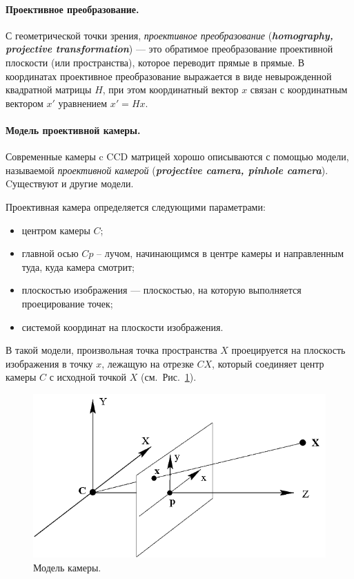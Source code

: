 \documentclass[oneside,final,12pt]{scrartcl}
\begin{document}
			\paragraph{Проективное преобразование.} С геометрической точки зрения, \textit{проективное преобразование} (\textit{\textbf{homography, projective transformation}}) — это обратимое преобразование проективной плоскости (или пространства), которое переводит прямые в прямые. В координатах проективное преобразование выражается в виде невырожденной квадратной матрицы \(H\), при этом координатный вектор \(x\) связан с координатным вектором \(x'\) уравнением \(x' = H x\).

			\paragraph{Модель проективной камеры.} Современные камеры c CCD матрицей хорошо описываются с помощью модели, называемой \textit{проективной камерой} (\textit{\textbf{projective camera, pinhole camera}}). Cуществуют и другие модели.

			Проективная камера определяется следующими параметрами:
			\begin{itemize}
				\item центром камеры \(C\);
				\item главной осью \(Cp\) -- лучом, начинающимся в центре камеры и направленным туда, куда камера смотрит;
				\item плоскостью изображения — плоскостью, на которую выполняется проецирование точек;
				\item системой координат на плоскости изображения.
			\end{itemize}
			В такой модели, произвольная точка пространства \(X\) проецируется на плоскость изображения в точку \(x\), лежащую на отрезке \(CX\), который соединяет центр камеры \(C\) с исходной точкой \(X\) (см.~Рис.~\ref{fig:cameramodel}).
			\begin{figure}[h]
				\centering
				\includegraphics[width=0.7\linewidth]{camera_model.png}
				\caption{Модель камеры.}
				\label{fig:cameramodel}
			\end{figure}
\end{document}
